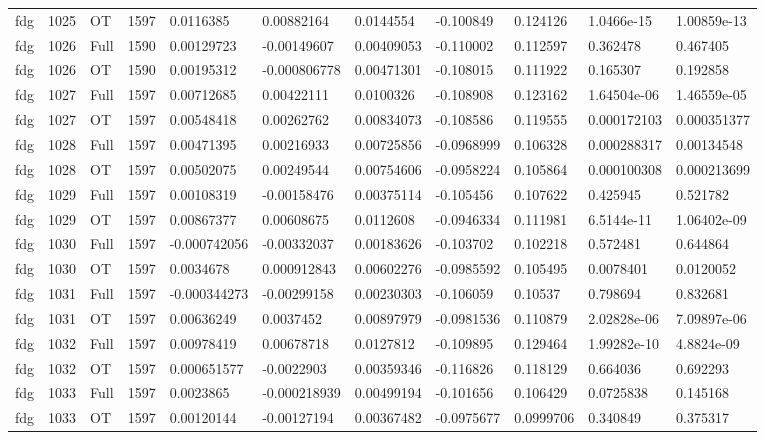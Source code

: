 \begin{landscape}
\begin{longtable}{lllllllllll}
fdg & 1025 & OT & 1597 & 0.0116385 & 0.00882164 & 0.0144554 & -0.100849 & 0.124126 & 1.0466e-15 & 1.00859e-13 \\
fdg & 1026 & Full & 1590 & 0.00129723 & -0.00149607 & 0.00409053 & -0.110002 & 0.112597 & 0.362478 & 0.467405 \\
fdg & 1026 & OT & 1590 & 0.00195312 & -0.000806778 & 0.00471301 & -0.108015 & 0.111922 & 0.165307 & 0.192858 \\
fdg & 1027 & Full & 1597 & 0.00712685 & 0.00422111 & 0.0100326 & -0.108908 & 0.123162 & 1.64504e-06 & 1.46559e-05 \\
fdg & 1027 & OT & 1597 & 0.00548418 & 0.00262762 & 0.00834073 & -0.108586 & 0.119555 & 0.000172103 & 0.000351377 \\
fdg & 1028 & Full & 1597 & 0.00471395 & 0.00216933 & 0.00725856 & -0.0968999 & 0.106328 & 0.000288317 & 0.00134548 \\
fdg & 1028 & OT & 1597 & 0.00502075 & 0.00249544 & 0.00754606 & -0.0958224 & 0.105864 & 0.000100308 & 0.000213699 \\
fdg & 1029 & Full & 1597 & 0.00108319 & -0.00158476 & 0.00375114 & -0.105456 & 0.107622 & 0.425945 & 0.521782 \\
fdg & 1029 & OT & 1597 & 0.00867377 & 0.00608675 & 0.0112608 & -0.0946334 & 0.111981 & 6.5144e-11 & 1.06402e-09 \\
fdg & 1030 & Full & 1597 & -0.000742056 & -0.00332037 & 0.00183626 & -0.103702 & 0.102218 & 0.572481 & 0.644864 \\
fdg & 1030 & OT & 1597 & 0.0034678 & 0.000912843 & 0.00602276 & -0.0985592 & 0.105495 & 0.0078401 & 0.0120052 \\
fdg & 1031 & Full & 1597 & -0.000344273 & -0.00299158 & 0.00230303 & -0.106059 & 0.10537 & 0.798694 & 0.832681 \\
fdg & 1031 & OT & 1597 & 0.00636249 & 0.0037452 & 0.00897979 & -0.0981536 & 0.110879 & 2.02828e-06 & 7.09897e-06 \\
fdg & 1032 & Full & 1597 & 0.00978419 & 0.00678718 & 0.0127812 & -0.109895 & 0.129464 & 1.99282e-10 & 4.8824e-09 \\
fdg & 1032 & OT & 1597 & 0.000651577 & -0.0022903 & 0.00359346 & -0.116826 & 0.118129 & 0.664036 & 0.692293 \\
fdg & 1033 & Full & 1597 & 0.0023865 & -0.000218939 & 0.00499194 & -0.101656 & 0.106429 & 0.0725838 & 0.145168 \\
fdg & 1033 & OT & 1597 & 0.00120144 & -0.00127194 & 0.00367482 & -0.0975677 & 0.0999706 & 0.340849 & 0.375317 \\

\end{longtable}
\end{landscape}
